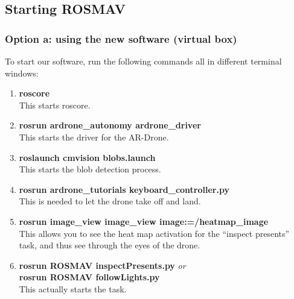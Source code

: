 \documentclass[a4paper,10pt]{article}
\begin{document}
\subsection{Starting ROSMAV}
\subsubsection{Option a: using the new software (virtual box)}
To start our software, run the following commands all in different terminal windows:
\begin{enumerate}
\item \textbf{roscore} \\ This starts roscore.
\item \textbf{rosrun ardrone\_autonomy ardrone\_driver} \\ This starts the driver for the AR-Drone.
\item \textbf{roslaunch cmvision blobs.launch} \\ This starts the blob detection process.
\item \textbf{rosrun ardrone\_tutorials keyboard\_controller.py} \\ This is needed to let the drone take off and land.
\item \textbf{rosrun image\_view image\_view image:=/heatmap\_image} \\ This
      allows you to see the heat map activation for the ``inspect presents''
      task, and thus see through the eyes of the drone.
\item \textbf{rosrun ROSMAV inspectPresents.py} \textit{or} \\
      \textbf{rosrun ROSMAV followLights.py} \\
      This actually starts the task. 
\end{enumerate}
\end{document}
